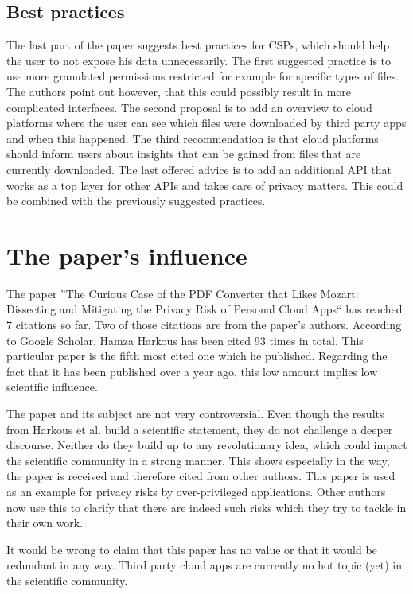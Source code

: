 \documentclass[11pt,twocolumn,a4paper,DIV=calc]{scrartcl}
\begin{document}
\subsection{Best practices}
The last part of the paper suggests best practices for CSPs, which should help the user to not expose his data unnecessarily. The first suggested practice is to use more granulated permissions restricted for example for specific types of files. The authors point out however, that this could possibly result in more complicated interfaces. The second proposal is to add an overview to cloud platforms where the user can see which files were downloaded by third party apps and when this happened. The third recommendation is that cloud platforms should inform users about insights that can be gained from files that are currently downloaded. The last offered advice is to add an additional API that works as a top layer for other APIs and takes care of privacy matters. This could be combined with the previously suggested practices.
\section{The paper's influence}
The paper ''The Curious Case of the PDF Converter that Likes Mozart: Dissecting and Mitigating the Privacy Risk of Personal Cloud Apps`` has reached 7 citations so far. Two of those citations are from the paper's authors. According to Google Scholar, Hamza Harkous has been cited 93 times in total.
This particular paper is the fifth most cited one which he published. Regarding the fact that it has been published over a year ago, this low amount implies low scientific influence.

The paper and its subject are not very controversial. Even though the results from Harkous et al. build a scientific statement, they do not challenge a deeper discourse. Neither do they build up to any revolutionary idea, which could impact the scientific community in a strong manner. This shows especially in the way, the paper is received and therefore cited from other authors. This paper is used as an example for privacy risks by over-privileged applications.
Other authors now use this to clarify that there are indeed such risks which they try to tackle in their own work.

It would be wrong to claim that this paper has no value or that it would be redundant in any way. Third party cloud apps are currently no hot topic (yet) in the scientific community.
\end{document}
